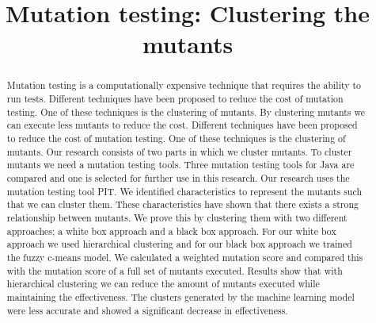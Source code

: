 \documentclass[conference,draftclsnofoot,onecolumn]{IEEEtran}
\begin{document}
\title{Mutation testing: Clustering the mutants}


\author{

\and
{}
\and
{}
}

\maketitle
\begin{abstract}
Mutation testing is a computationally expensive technique that requires the ability to run tests.
Different techniques have been proposed to reduce the cost of mutation testing.
One of these techniques is the clustering of mutants.
By clustering mutants we can execute less mutants to reduce the cost.
Different techniques have been proposed to reduce the cost of mutation testing.
One of these techniques is the clustering of mutants.
Our research consists of two parts in which we cluster mutants.
To cluster mutants we need a mutation testing tools.
Three mutation testing tools for Java are compared and one is selected for further use in this research.
Our research uses the mutation testing tool PIT.
We identified characteristics to represent the mutants such that we can cluster them.
These characteristics have shown that there exists a strong relationship between mutants. 
We prove this by clustering them with two different approaches; a white box approach and a black box approach.
For our white box approach we used hierarchical clustering and for our black box approach we trained the fuzzy c-means model.
We calculated a weighted mutation score and compared this with the mutation score of a full set of mutants executed.
Results show that with hierarchical clustering we can reduce the amount of mutants executed while maintaining the effectiveness.
The clusters generated by the machine learning model were less accurate and showed a significant decrease in effectiveness.
\end{abstract}
\end{document}
